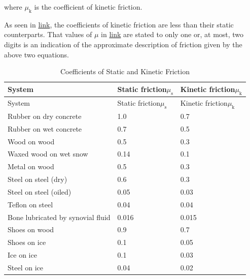 \documentclass[
]{book}
\begin{document}
where \(\mu_{\text{k}}{}\) is the coefficient of kinetic friction.

As seen in \protect\hyperlink{import-auto-id1165298658126}{link},
the coefficients of kinetic friction are less than their static
counterparts. That values of \(\mu{}\)\emph{} in
\protect\hyperlink{import-auto-id1165298658126}{link} are stated
to only one or, at most, two digits is an indication of the approximate
description of friction given by the above two equations.

\begin{longtable}[]{@{}lll@{}}
\caption{{Coefficients of Static and Kinetic Friction}}\tabularnewline
\toprule
System & Static friction\(\mu_{\text{s}}{}\) & Kinetic friction\(\mu_{\text{k}}{}\) \\
\midrule
\endfirsthead
\toprule
System & Static friction\(\mu_{\text{s}}{}\) & Kinetic friction\(\mu_{\text{k}}{}\) \\
\midrule
\endhead
Rubber on dry concrete & 1.0 & 0.7 \\
Rubber on wet concrete & 0.7 & 0.5 \\
Wood on wood & 0.5 & 0.3 \\
Waxed wood on wet snow & 0.14 & 0.1 \\
Metal on wood & 0.5 & 0.3 \\
Steel on steel (dry) & 0.6 & 0.3 \\
Steel on steel (oiled) & 0.05 & 0.03 \\
Teflon on steel & 0.04 & 0.04 \\
Bone lubricated by synovial fluid & 0.016 & 0.015 \\
Shoes on wood & 0.9 & 0.7 \\
Shoes on ice & 0.1 & 0.05 \\
Ice on ice & 0.1 & 0.03 \\
Steel on ice & 0.04 & 0.02 \\
\bottomrule
\end{longtable}
\end{document}
